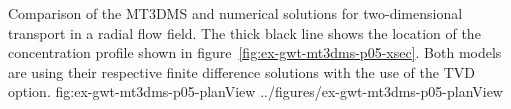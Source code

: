 \begin{StandardFigure}
	{Comparison of the MT3DMS and \mf numerical solutions for two-dimensional transport in a radial flow field.  The thick black line shows the location of the concentration profile shown in figure~\ref{fig:ex-gwt-mt3dms-p05-xsec}. Both models are using their respective finite difference solutions with the use of the TVD option.} 
	{fig:ex-gwt-mt3dms-p05-planView}
	{../figures/ex-gwt-mt3dms-p05-planView}
\end{StandardFigure}

